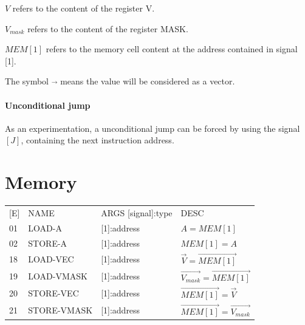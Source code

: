 \documentclass{scrreprt}
\begin{document}
	\textbf{$V$} refers to the content of the register V.
	
	\textbf{$V_{mask}$} refers to the content of the register MASK.
	
	\textbf{$MEM[1]$} refers to the memory cell content at the address contained in signal [1].
	
	The symbol $\vec{ }$ means the value will be considered as a vector.
	
	\paragraph{Unconditional jump}
	As an experimentation, a unconditional jump can be forced by using the signal $[J]$, containing the next instruction address. 
	
	\section{Memory}
	\begin{tabular}{l | l | l  l}
		[E] & NAME & ARGS [signal]:type & DESC \\
		01 & LOAD-A & [1]:address & $A = MEM[1]$\\
		02 & STORE-A & [1]:address & $MEM[1] = A$\\
		18 & LOAD-VEC & [1]:address & $\vec{V} = \vec{MEM[1]}$\\
		19 & LOAD-VMASK & [1]:address & $\vec{V_{mask}} = \vec{MEM[1]}$\\
		20 & STORE-VEC & [1]:address & $\vec{MEM[1]} = \vec{V}$\\
		21 & STORE-VMASK & [1]:address & $\vec{MEM[1]} = \vec{V_{mask}}$\\
	\end{tabular}
	
\end{document}
